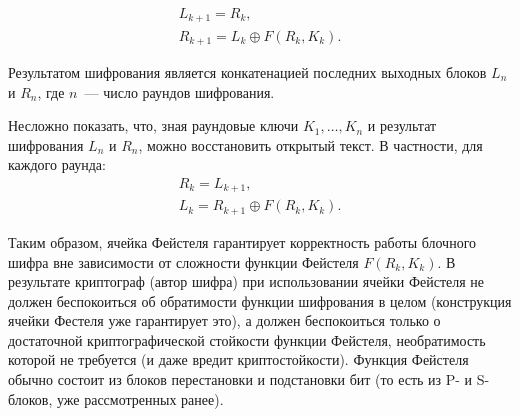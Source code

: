 \[\begin{array}{l}
    L_{k+1} = R_{k}, \\
    R_{k+1} = L_{k} \oplus F\left( R_k, K_k \right).
\end{array}\]

Результатом шифрования является конкатенацией последних выходных блоков $L_n$ и $R_n$, где $n$~--- число раундов шифрования.

Несложно показать, что, зная раундовые ключи $K_1, \dots, K_n$ и результат шифрования $L_n$ и $R_n$, можно восстановить открытый текст. В частности, для каждого раунда:
\[\begin{array}{l}
    R_k = L_{k+1}, \\
    L_k = R_{k+1} \oplus F\left( R_k, K_k \right).
\end{array}\]

Таким образом, ячейка Фейстеля гарантирует корректность работы блочного шифра вне зависимости от сложности функции Фейстеля $F\left(R_k, K_k \right)$. В результате криптограф (автор шифра) при использовании ячейки Фейстеля не должен беспокоиться об обратимости функции шифрования в целом (конструкция ячейки Фестеля уже гарантирует это), а должен беспокоиться только о достаточной криптографической стойкости функции Фейстеля, необратимость которой не требуется (и даже вредит криптостойкости). Функция Фейстеля обычно состоит из блоков перестановки и подстановки бит (то есть из P- и S-блоков, уже рассмотренных ранее).

